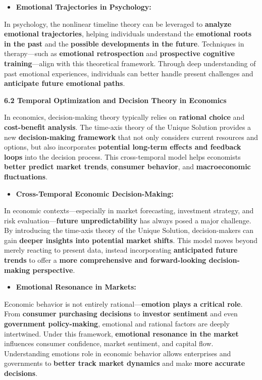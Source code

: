 \documentclass[
]{article}
\begin{document}
\begin{itemize}
\item
  \textbf{Emotional Trajectories in Psychology:}
\end{itemize}

In psychology, the nonlinear timeline theory can be leveraged to
\textbf{analyze emotional trajectories}, helping individuals understand
the \textbf{emotional roots in the past} and the \textbf{possible
developments in the future}. Techniques in therapy---such as
\textbf{emotional retrospection} and \textbf{prospective cognitive
training}---align with this theoretical framework. Through deep
understanding of past emotional experiences, individuals can better
handle present challenges and \textbf{anticipate future emotional
paths}.

\textbf{6.2 Temporal Optimization and Decision Theory in Economics}

In economics, decision-making theory typically relies on
\textbf{rational choice} and \textbf{cost-benefit analysis}. The
time-axis theory of the Unique Solution provides a new
\textbf{decision-making framework} that not only considers current
resources and options, but also incorporates \textbf{potential long-term
effects and feedback loops} into the decision process. This
cross-temporal model helps economists \textbf{better predict market
trends}, \textbf{consumer behavior}, and \textbf{macroeconomic
fluctuations}.

\begin{itemize}
\item
  \textbf{Cross-Temporal Economic Decision-Making:}
\end{itemize}

In economic contexts---especially in market forecasting, investment
strategy, and risk evaluation---\textbf{future unpredictability} has
always posed a major challenge. By introducing the time-axis theory of
the Unique Solution, decision-makers can gain \textbf{deeper insights
into potential market shifts}. This model moves beyond merely reacting
to present data, instead incorporating \textbf{anticipated future
trends} to offer a \textbf{more comprehensive and forward-looking
decision-making perspective}.

\begin{itemize}
\item
  \textbf{Emotional Resonance in Markets:}
\end{itemize}

Economic behavior is not entirely rational---\textbf{emotion plays a
critical role}. From \textbf{consumer purchasing decisions} to
\textbf{investor sentiment} and even \textbf{government policy-making},
emotional and rational factors are deeply intertwined. Under this
framework, \textbf{emotional resonance in the market} influences
consumer confidence, market sentiment, and capital flow. Understanding
emotion\textquotesingle s role in economic behavior allows enterprises
and governments to \textbf{better track market dynamics} and make
\textbf{more accurate decisions}.
\end{document}
